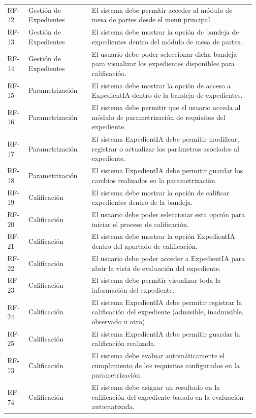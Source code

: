 \documentclass[12pt,a4paper,oneside]{book}
\begin{document}
\begin{longtable}{@{}>{\centering\arraybackslash}p{2cm}
                    >{\centering\arraybackslash}p{3cm}
                    >{\raggedright\arraybackslash}p{10cm}@{}}
RF-12 & Gestión de Expedientes & El sistema debe permitir acceder al módulo de mesa de partes desde el menú principal. \\
RF-13 & Gestión de Expedientes & El sistema debe mostrar la opción de bandeja de expedientes dentro del módulo de mesa de partes. \\
RF-14 & Gestión de Expedientes & El usuario debe poder seleccionar dicha bandeja para visualizar los expedientes disponibles para calificación. \\
\midrule
RF-15 & Parametrización & El sistema debe mostrar la opción de acceso a ExpedientIA dentro de la bandeja de expedientes. \\
RF-16 & Parametrización & El sistema debe permitir que el usuario acceda al módulo de parametrización de requisitos del expediente. \\
RF-17 & Parametrización & El sistema ExpedientIA debe permitir modificar, registrar o actualizar los parámetros asociados al expediente. \\
RF-18 & Parametrización & El sistema ExpedientIA debe permitir guardar los cambios realizados en la parametrización. \\
\midrule
RF-19 & Calificación & El sistema debe mostrar la opción de calificar expedientes dentro de la bandeja. \\
RF-20 & Calificación & El usuario debe poder seleccionar esta opción para iniciar el proceso de calificación. \\
RF-21 & Calificación & El sistema debe mostrar la opción ExpedientIA dentro del apartado de calificación. \\
RF-22 & Calificación & El usuario debe poder acceder a ExpedientIA para abrir la vista de evaluación del expediente. \\
RF-23 & Calificación & El sistema debe permitir visualizar toda la información del expediente. \\
RF-24 & Calificación & El sistema ExpedientIA debe permitir registrar la calificación del expediente (admisible, inadmisible, observado u otro). \\
RF-25 & Calificación & El sistema ExpedientIA debe permitir guardar la calificación realizada. \\
RF-73 & Calificación & El sistema debe evaluar automáticamente el cumplimiento de los requisitos configurados en la parametrización. \\
RF-74 & Calificación & El sistema debe asignar un resultado en la calificación del expediente basado en la evaluación automatizada. \\

\end{longtable}
\end{document}

